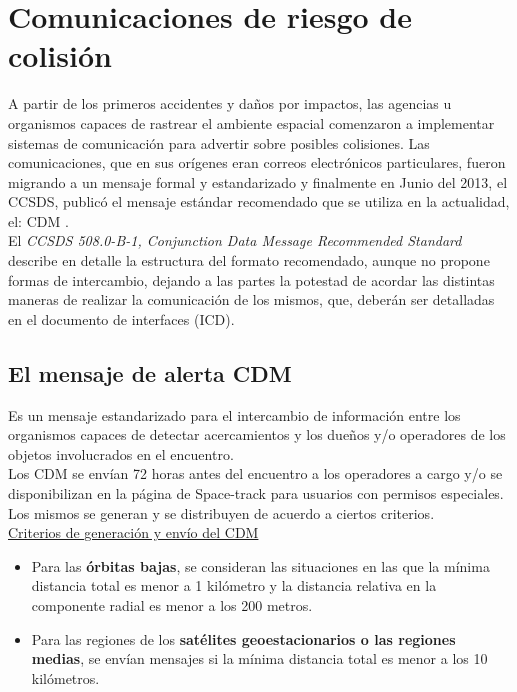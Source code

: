 \section{Comunicaciones de riesgo de colisi\'on}{\label{sec:anuncio}}


A partir de los primeros accidentes y da\~nos por impactos, las agencias u organismos capaces de rastrear el ambiente espacial comenzaron a implementar sistemas de comunicaci\'on para advertir sobre posibles colisiones. Las comunicaciones, que en sus or\'igenes eran correos electr\'onicos particulares, fueron migrando a un mensaje formal y estandarizado y finalmente en Junio del 2013, el \ac{CCSDS}, public\'o el mensaje est\'andar recomendado que se utiliza en la actualidad, el: \ac{CDM} \citep{CDM}.\\

El {\it{CCSDS 508.0-B-1, Conjunction Data Message Recommended Standard}} describe en detalle la estructura del formato recomendado, aunque no propone formas de intercambio, dejando a las partes la potestad de acordar las distintas maneras de realizar la comunicaci\'on de los mismos, que, deber\'an ser detalladas en el documento de interfaces (ICD).\\

\subsection{El mensaje de alerta CDM}\label{subsec:cdm}

Es un mensaje estandarizado para el intercambio de informaci\'on entre los organismos capaces de detectar acercamientos y los due\~nos y/o operadores de los objetos involucrados en el encuentro.\\

Los CDM se env\'ian 72 horas antes del encuentro a los operadores a cargo y/o se disponibilizan en la p\'agina de Space-track para usuarios con permisos especiales. Los mismos se generan y se distribuyen de acuerdo a ciertos criterios.\\


\underline{Criterios de generaci\'on y env\'io del CDM}
\begin{itemize}
\item Para las {\bf{\'orbitas bajas}}, se consideran las situaciones en las que la m\'inima distancia total es menor a 1 kil\'ometro y la distancia relativa en la componente radial es menor a los 200 metros.\\

\item Para las regiones de los {\bf{sat\'elites geoestacionarios o las regiones medias}}, se env\'ian mensajes si la m\'inima distancia total es menor a los 10 kil\'ometros.\\
\end{itemize}


